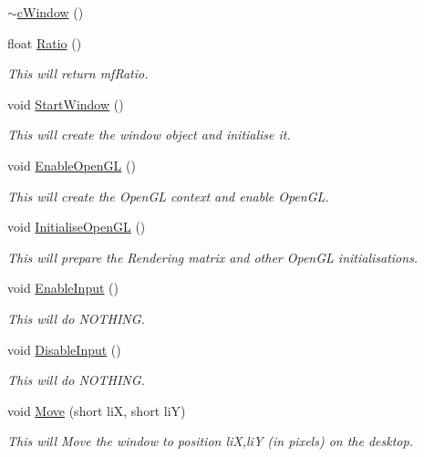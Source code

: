 \begin{DoxyCompactItemize}
\hyperlink{classc_window_a48502f6781b08d6f8c63b747aa86e9a7}{$\sim$cWindow} ()
\item 
float \hyperlink{classc_window_a309e455488789cb3e28e22ce44cbeb03}{Ratio} ()
\begin{DoxyCompactList}\small\item\em This will return mfRatio. \item\end{DoxyCompactList}\item 
void \hyperlink{classc_window_a78a9796ac50caf5898b8bb06562a2ba0}{StartWindow} ()
\begin{DoxyCompactList}\small\item\em This will create the window object and initialise it. \item\end{DoxyCompactList}\item 
void \hyperlink{classc_window_ae1db6649e46ab1bd042d81f388cacf94}{EnableOpenGL} ()
\begin{DoxyCompactList}\small\item\em This will create the OpenGL context and enable OpenGL. \item\end{DoxyCompactList}\item 
void \hyperlink{classc_window_a41bf3f9e63c0d3d010fb97472f1d20a2}{InitialiseOpenGL} ()
\begin{DoxyCompactList}\small\item\em This will prepare the Rendering matrix and other OpenGL initialisations. \item\end{DoxyCompactList}\item 
void \hyperlink{classc_window_a10f067c7362e0a9c8197f7f809eacfb3}{EnableInput} ()
\begin{DoxyCompactList}\small\item\em This will do NOTHING. \item\end{DoxyCompactList}\item 
void \hyperlink{classc_window_a64911ed09b5b759c461f2ddfba7f2d11}{DisableInput} ()
\begin{DoxyCompactList}\small\item\em This will do NOTHING. \item\end{DoxyCompactList}\item 
void \hyperlink{classc_window_a11e2c0045091c6e6826361f8c68b2022}{Move} (short liX, short liY)
\begin{DoxyCompactList}\small\item\em This will Move the window to position liX,liY (in pixels) on the desktop. \item\end{DoxyCompactList}\item 

\end{DoxyCompactItemize}
